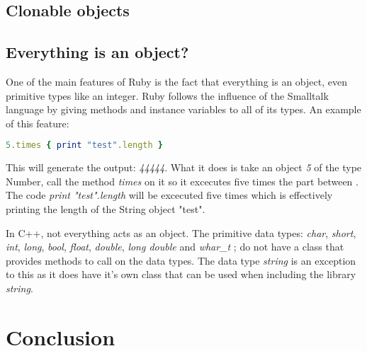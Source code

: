 \documentclass[10pt,a4paper,twocolumn]{article}
\begin{document}
\subsection{Clonable objects}

\subsection{Everything is an object?}

One of the main features of Ruby is the fact that everything is an object, even primitive types like an integer. Ruby follows the influence of the Smalltalk language by giving methods and instance variables to all of its types. An example of this feature:

\begin{lstlisting}[language=Ruby]
5.times { print "test".length }
\end{lstlisting}

This will generate the output: \textit{44444}. What it does is take an object \textit{5} of the type Number, call the method \textit{times} on it so it excecutes five times the part between . The code \textit{print "test".length} will be excecuted five times which is effectively printing the length of the String object "test".

In C++, not everything acts as an object. The primitive data types: \textit{char}, \textit{short}, \textit{int}, \textit{long}, \textit{bool}, \textit{float}, \textit{double}, \textit{long double} and \textit{whar\_t} ; do not have a class that provides methods to call on the data types. The data type \textit{string} is an exception to this as it does have it's own class that can be used when including the library \textit{string}.

\section{Conclusion}
\end{document}
